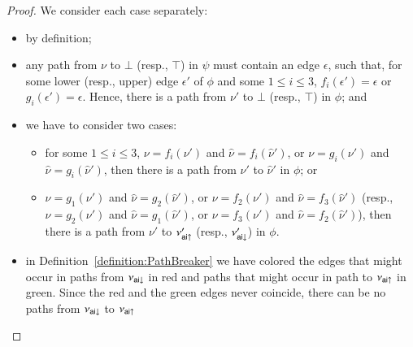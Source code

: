\begin{proof}
We consider each case separately:
\begin{itemize}
  \item by definition;
  \item any path from $\nu$ to $\bot$ (resp., $\top$) in $\psi$ must contain an edge $\epsilon$, such that, for some lower (resp., upper) edge $\epsilon'$ of $\phi$ and some $1\le i\le 3$, $f_i(\epsilon')=\epsilon$ or $g_i(\epsilon')=\epsilon$. Hence, there is a path from $\nu'$ to $\bot$ (resp., $\top$) in $\phi$; and
  \item we have to consider two cases:
  \begin{itemize}
    \item for some $1\le i\le 3$, $\nu=f_i(\nu')$ and $\hat\nu=f_i(\hat\nu')$, or $\nu=g_i(\nu')$ and $\hat\nu=g_i(\hat\nu')$, then there is a path from $\nu'$ to $\hat\nu'$ in $\phi$; or
    \item $\nu=g_1(\nu')$ and $\hat\nu=g_2(\hat\nu')$, or $\nu=f_2(\nu')$ and $\hat\nu=f_3(\hat\nu')$ (resp., $\nu=g_2(\nu')$ and $\hat\nu=g_1(\hat\nu')$, or $\nu=f_3(\nu')$ and $\hat\nu=f_2(\hat\nu')$), then there is a path from $\nu'$ to $\nu'_{{\mathsf{ai}}{\uparrow}}$ (resp., $\nu'_{{\mathsf{ai}}{\downarrow}}$) in $\phi$.
  \end{itemize}
  \item in Definition~\ref{definition:PathBreaker} we have colored the edges that might occur in paths from $\nu_{{\mathsf{ai}}{\downarrow}}$ in red and paths that might occur in path to $\nu_{{\mathsf{ai}}{\uparrow}}$ in green. Since the red and the green edges never coincide, there can be no paths from $\nu_{{\mathsf{ai}}{\downarrow}}$ to $\nu_{{\mathsf{ai}}{\uparrow}}$
\end{itemize}
\end{proof}

